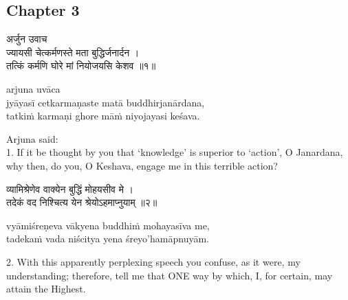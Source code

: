 \chapterdrop

\begin{center}

\headerspace
{}

\section{Chapter 3}

\headerspace
{}

\headerspace
{}

\headerspace
{}

\headerspace
\end{center}

\begin{gitaverse}
अर्जुन उवाच \\
ज्यायसी चेत्कर्मणस्ते मता बुद्धिर्जनार्दन । \\
तत्किं कर्मणि घोरे मां नियोजयसि केशव ॥१॥
\end{gitaverse}

\begin{transliteration}
arjuna uvāca \\
jyāyasī cetkarmaṇaste matā buddhirjanārdana, \\
tatkiṁ karmaṇi ghore māṁ niyojayasi keśava.
\end{transliteration}

Arjuna said: \\
1. If it be thought by you that `knowledge' is superior to `action', O
Janardana, why then, do you, O Keshava, engage me in this terrible action?

\begin{gitaverse}
व्यामिश्रेणेव वाक्येन बुद्धिं मोहयसीव मे । \\
तदेकं वद निश्चित्य येन श्रेयोऽहमाप्नुयाम् ॥२॥
\end{gitaverse}

\begin{transliteration}
vyāmiśreṇeva vākyena buddhiṁ mohayasīva me, \\
tadekaṁ vada niścitya yena śreyo'hamāpnuyām.
\end{transliteration}

2. With this apparently perplexing speech you confuse, as it were, my
understanding; therefore, tell me that ONE way by which, I, for certain, may
attain the Highest.

